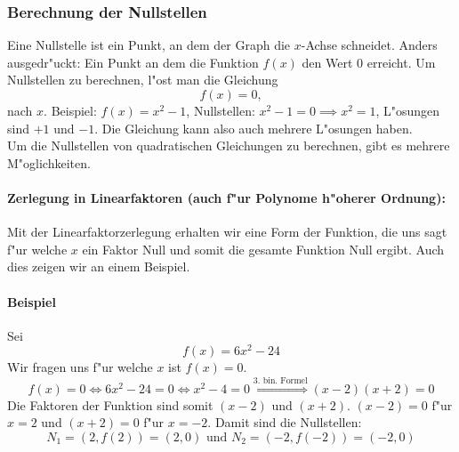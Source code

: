\subsubsection{Berechnung der Nullstellen} \label{sec:quadnullstellen}
Eine Nullstelle ist ein Punkt, an dem der Graph die $x$-Achse schneidet. Anders ausgedr"uckt: Ein Punkt an dem die Funktion $f(x)$ den Wert $0$ erreicht. Um Nullstellen zu berechnen, l"ost man die Gleichung
\begin{equation*}
f(x) = 0,
\end{equation*}
nach $x$. Beispiel: $f(x)=x^2-1$, Nullstellen: $x^2-1=0\implies x^2=1$, L"osungen sind $+1$ und $-1$. Die Gleichung kann also auch mehrere L"osungen haben.\\
Um die Nullstellen von quadratischen Gleichungen zu berechnen, gibt es mehrere M"oglichkeiten.

\paragraph{Zerlegung in Linearfaktoren (auch f"ur Polynome h"oherer Ordnung):}

Mit der Linearfaktorzerlegung erhalten wir eine Form der Funktion, die uns sagt f"ur welche $x$ ein Faktor Null und somit die gesamte Funktion Null ergibt. Auch dies zeigen wir an einem Beispiel.

\paragraph{Beispiel}
Sei
\begin{equation*}
f(x) = 6x^2 - 24
\end{equation*}
Wir fragen uns f"ur welche $x$ ist $f(x) = 0$.
\begin{equation*}
f(x) = 0 \iff 6x^2 - 24 = 0 \iff x^2 - 4 = 0 \stackrel{\text{3. bin. Formel}}{\iff} (x-2)(x+2) = 0 
\end{equation*}
Die Faktoren der Funktion sind somit $(x-2)$ und $(x+2)$. $(x-2) = 0$ f"ur $x = 2$ und $(x+2) = 0$ f"ur  $x = -2$. Damit sind die Nullstellen:
\begin{equation*}
N_1 = (2, f(2)) = (2, 0) \text{ und } N_2 = (-2, f(-2)) = (-2, 0)
\end{equation*}

